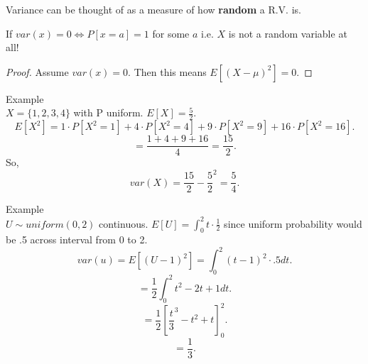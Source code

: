 \documentclass[a4paper]{article}
\begin{document}
\begin{proof}{Let $\mu = E[X]$
  \begin{align*}
    E[(X - \mu)^2] &= E[X^2 - 2 \mu X + \mu^2] \\
                   &= E[X^2] - 2 \mu E[X] + \mu^2 \\
                   &= E[X^2] - 2 \mu^2 + \mu^2 \\
                   &= E[X^2] - \mu^2 \\
                   &= E[X^2] - E[X]^2 
  .\end{align*}
\end{proof}

\begin{remark}
  Variance can be thought of as a measure of how \textbf{random} a R.V. is.
\end{remark}

\begin{prop}
  If $var(x) = 0 \iff P[x=a]=1$ for some $a$ i.e. $X$ is not a random variable at all!

  \begin{proof}
    Assume $var(x) = 0$. Then this means $E[(X - \mu)^2] = 0$. 
  \end{proof}
\end{prop}

\begin{remark}{Example} \\
  $X = \{1,2,3,4\}$ with P uniform. $E[X] = \frac{5}{2}$. 
  \[
  E[X^2] = 1 \cdot P[X^2 = 1] + 4 \cdot P[X^2 = 4] + 9 \cdot P[X^2 = 9] + 16 \cdot P[X^2 = 16]
  .\] 
  \[
  = \frac{1+4+9+16}{4} = \frac{15}{2}
  .\] 
  So,
  \[
  var(X) = \frac{15}{2} - \frac{5}{2}^2 = \frac{5}{4}
  .\] 
\end{remark}

\begin{remark}{Example} \\
  $U \sim uniform(0,2)$ continuous. $E[U] = \int_0^2 t \cdot \frac{1}{2}$ since uniform probability would be .5 
  across interval from 0 to 2. 
  \[
    var(u) = E[(U-1)^2] = \int_0^2 (t-1)^2 \cdot .5 dt  
  .\] 
  \[
    = \frac{1}{2} \int_0^2 t^2 - 2t + 1 dt
  .\] 
  \[
    = \frac{1}{2} [\frac{t}{3}^3 - t^2 + t]_0^2
  .\] 
  \[
   = \frac{1}{3}
  .\] 
  
\end{remark}
\end{document}
